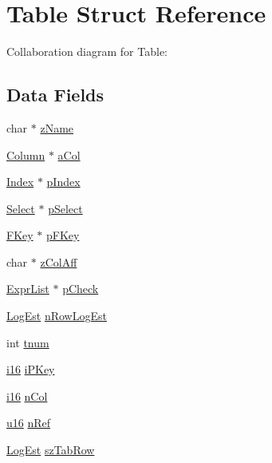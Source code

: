 \hypertarget{struct_table}{}\section{Table Struct Reference}
\label{struct_table}


Collaboration diagram for Table\+:
\subsection*{Data Fields}
\begin{DoxyCompactItemize}
\item 
char $\ast$ \hyperlink{struct_table_a661118d86ac4127d40bf3be78d92117d}{z\+Name}
\item 
\hyperlink{struct_column}{Column} $\ast$ \hyperlink{struct_table_a2da93dd6a8de10f66932ab892192c497}{a\+Col}
\item 
\hyperlink{struct_index}{Index} $\ast$ \hyperlink{struct_table_a2bf7196ac1f39bd4b9dc95c3a9e9a68e}{p\+Index}
\item 
\hyperlink{struct_select}{Select} $\ast$ \hyperlink{struct_table_ab0e0ccc47de126415a7ad889ff1d228a}{p\+Select}
\item 
\hyperlink{struct_f_key}{F\+Key} $\ast$ \hyperlink{struct_table_a391d064a091c847c4126539c4e5dc2a8}{p\+F\+Key}
\item 
char $\ast$ \hyperlink{struct_table_a829718486911afcd2a61c54f28491d76}{z\+Col\+Aff}
\item 
\hyperlink{struct_expr_list}{Expr\+List} $\ast$ \hyperlink{struct_table_abdb4a0cc96d88f28033ed144b65d62e9}{p\+Check}
\item 
\hyperlink{sqlite3_8c_aa0f9b3b63ad120ac15b96785b05ce733}{Log\+Est} \hyperlink{struct_table_ac2127b14f276f530c81bd417d54d7ff6}{n\+Row\+Log\+Est}
\item 
int \hyperlink{struct_table_a2943a2c9e4915d379274c39cbb0147d9}{tnum}
\item 
\hyperlink{sqlite3_8c_a7b32340f65cd15f029caad258fb3355c}{i16} \hyperlink{struct_table_a5945a7cb5671a843d71c7b87509bcd33}{i\+P\+Key}
\item 
\hyperlink{sqlite3_8c_a7b32340f65cd15f029caad258fb3355c}{i16} \hyperlink{struct_table_ae35439b3ccd25c30078f95bf0b32b3ac}{n\+Col}
\item 
\hyperlink{sqlite3_8c_a20f2299e322dcbde37cb07b16910b843}{u16} \hyperlink{struct_table_ac2eee41dc41e1b46e339e947bf3e792f}{n\+Ref}
\item 
\hyperlink{sqlite3_8c_aa0f9b3b63ad120ac15b96785b05ce733}{Log\+Est} \hyperlink{struct_table_a7eafe67f3b311efdeb6344e5086cba08}{sz\+Tab\+Row}

\end{DoxyCompactItemize}
